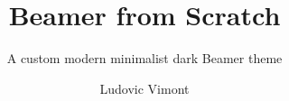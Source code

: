 \documentclass{beamer}
\title{Beamer from Scratch}
\subtitle{A custom modern minimalist dark Beamer theme}
\author{Ludovic Vimont}
\begin{document}
\frame{\titlepage}
\end{document}
